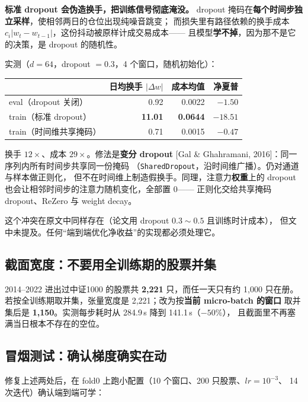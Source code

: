 \documentclass[11pt, a4paper]{ctexart}
\newcommand{\file}[1]{\texttt{\small #1}}
\begin{document}
\begin{warnbox}
\textbf{标准 dropout 会伪造换手，把训练信号彻底淹没。}
dropout 掩码在\textbf{每个时间步独立采样}，使相邻两日的仓位出现纯噪音跳变；
而损失里有路径依赖的换手成本 $c_i|w_t - w_{t-1}|$，这份抖动被原样计成交易成本——
且模型\textbf{学不掉}，因为那不是它的决策，是 dropout 的随机性。

实测（$d{=}64$，dropout $=0.3$，4 个窗口，随机初始化）：

\begin{center}
\small
\begin{tabular}{lrrr}
\toprule
 & 日均换手 $|\Delta w|$ & 成本均值 & 净夏普 \\
\midrule
eval（dropout 关闭） & 0.92 & 0.0022 & $-1.50$ \\
train（标准 dropout） & \textbf{11.01} & \textbf{0.0644} & \textbf{$-18.51$} \\
train（时间维共享掩码） & 0.71 & 0.0015 & $-0.47$ \\
\bottomrule
\end{tabular}
\end{center}

换手 $12\times$、成本 $29\times$。修法是\textbf{变分 dropout}
[Gal \& Ghahramani, 2016]：同一序列内所有时间步共享同一份掩码
（\file{SharedDropout}，沿时间维广播）。仍对通道与样本做正则化，
但不在时间维上制造假换手。同理，注意力\textbf{权重}上的 dropout
也会让相邻时间步的注意力随机变化，全部置 0——
正则化交给共享掩码 dropout、ReZero 与 weight decay。

这个冲突在原文中同样存在（论文用 dropout $0.3\sim0.5$ 且训练时计成本），
但文中未提及。任何“端到端优化净收益”的实现都必须处理它。
\end{warnbox}

\subsection{截面宽度：不要用全训练期的股票并集}
\begin{warnbox}
2014--2022 进出过中证1000 的股票共 \textbf{2{,}221} 只，而任一天只有约 1{,}000 只在册。
若按全训练期取并集，张量宽度是 2{,}221；改为按\textbf{当前 micro-batch 的窗口}
取并集后是 \textbf{1{,}150}。实测每步耗时从 284.9\,s 降到 141.1\,s（$-50\%$），
且截面里不再塞满当日根本不存在的空位。
\end{warnbox}

\subsection{冒烟测试：确认梯度确实在动}
修复上述两处后，在 fold0 上跑小配置（10 个窗口、200 只股票、$lr{=}10^{-3}$、
14 次迭代）确认端到端可学：
\end{document}
